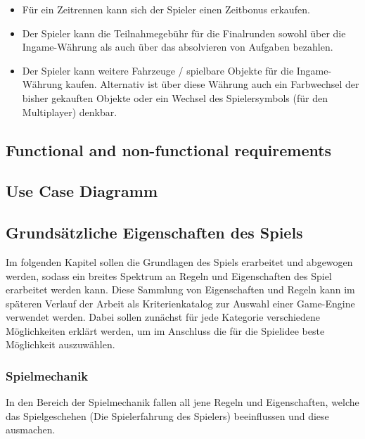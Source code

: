 \begin{enumerate}
\begin{itemize}
			\item{Für ein Zeitrennen kann sich der Spieler einen Zeitbonus erkaufen.}
			\item{Der Spieler kann die Teilnahmegebühr für die Finalrunden sowohl über die Ingame-Währung als auch über das absolvieren von Aufgaben bezahlen.}
			\item{Der Spieler kann weitere Fahrzeuge / spielbare Objekte für die Ingame-Währung kaufen. Alternativ ist über diese Währung auch ein Farbwechsel der bisher gekauften Objekte oder ein Wechsel des Spielersymbols (für den Multiplayer) denkbar.}
		\end{itemize}
	\end{enumerate}

\subsection{Functional and non-functional requirements}
\subsection{Use Case Diagramm}

\subsection{Grundsätzliche Eigenschaften des Spiels}
	Im folgenden Kapitel sollen die Grundlagen des Spiels erarbeitet und abgewogen werden, sodass ein breites Spektrum an Regeln und Eigenschaften des Spiel erarbeitet werden kann. Diese Sammlung von Eigenschaften und Regeln kann im späteren Verlauf der Arbeit als Kriterienkatalog zur Auswahl einer Game-Engine verwendet werden. Dabei sollen zunächst für jede Kategorie verschiedene Möglichkeiten erklärt werden, um im Anschluss die für die Spielidee beste Möglichkeit auszuwählen.

	\subsubsection{Spielmechanik}
	In den Bereich der Spielmechanik fallen all jene Regeln und Eigenschaften, welche das Spielgeschehen (Die Spielerfahrung des Spielers) beeinflussen und diese ausmachen.

